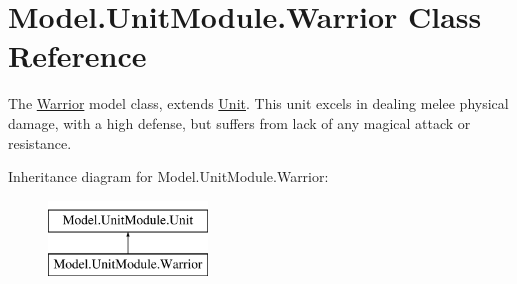 \hypertarget{class_model_1_1_unit_module_1_1_warrior}{}\section{Model.\+Unit\+Module.\+Warrior Class Reference}
\label{class_model_1_1_unit_module_1_1_warrior}


The \hyperlink{class_model_1_1_unit_module_1_1_warrior}{Warrior} model class, extends \hyperlink{interface_model_1_1_unit_module_1_1_unit}{Unit}. This unit excels in dealing melee physical damage, with a high defense, but suffers from lack of any magical attack or resistance.  


Inheritance diagram for Model.\+Unit\+Module.\+Warrior\+:\begin{figure}[H]
\begin{center}
\leavevmode
\includegraphics[height=2.000000cm]{class_model_1_1_unit_module_1_1_warrior}
\end{center}
\end{figure}
